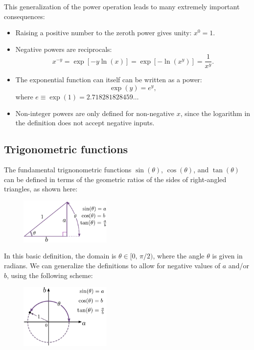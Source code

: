 \documentclass[10pt,a4paper]{article}
\begin{document}
This generalization of the power operation leads to many extremely
important consequences:
\begin{itemize}
\item 
  Raising a positive number to the zeroth power gives unity:
  $\displaystyle x^0 = 1$.
\item
  Negative powers are reciprocals:
  \begin{equation*}
    x^{-y} =
    \exp[-y\ln(x)] = \exp[-\ln(x^y)] = \frac{1}{x^y}.
  \end{equation*}

\item
  The exponential function can itself can be written as a power:
  \begin{equation*}
    \exp(y) = e^y,
  \end{equation*}
  where $e \equiv \exp(1) = 2.718281828459\dots$
\item
  Non-integer powers are only defined for non-negative $x$, since the
  logarithm in the definition does not accept negative inputs.
\end{itemize}

\subsection{Trigonometric functions}
\label{trigo}

The fundamental trignonometric functions $\sin(\theta)$,
$\cos(\theta)$, and $\tan(\theta)$ can be defined in terms of the
geometric ratios of the sides of right-angled triangles, as shown here:

\begin{figure}[h]
  \centering\includegraphics[width=0.4\textwidth]{trigonometry}
\end{figure}

In this basic definition, the domain is $\theta \in [0, \,\pi/2)$,
  where the angle $\theta$ is given in radians. We can generalize the
  definitions to allow for negative values of $a$ and/or $b$, using
  the following scheme:

\begin{figure}[h]
  \centering\includegraphics[width=0.4\textwidth]{trigonometry2}
\end{figure}
\end{document}
